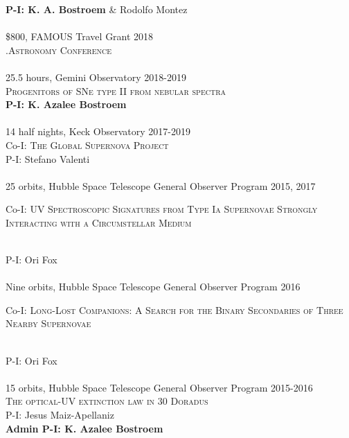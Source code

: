 \documentclass[10pt]{cv}
\begin{document}
\begin{llist}
{\bf P-I: K. A. Bostroem} \& Rodolfo Montez\\
\\
\$800, FAMOUS Travel Grant \hfill2018\\ 
\textsc{.Astronomy Conference}\\
\\
25.5 hours, Gemini Observatory \hfill 2018-2019\\
\textsc{Progenitors of SNe type II from nebular spectra}\\
{\bf P-I: K. Azalee Bostroem} \\
\\
14 half nights, Keck Observatory \hfill 2017-2019\\
Co-I: \textsc{The Global Supernova Project}\\
P-I: Stefano Valenti \\
\\
25 orbits, Hubble Space Telescope General Observer Program \hfill 2015, 2017\\ %
\begin{minipage}[l]{0.7\textwidth}\vspace{0.15cm}
Co-I: \textsc{UV Spectroscopic Signatures from Type Ia Supernovae Strongly Interacting with a Circumstellar Medium}
\end{minipage}\vspace{0.15cm}\\
P-I: Ori Fox \\
\\
Nine orbits, Hubble Space Telescope General Observer Program \hfill 2016\\ %
\begin{minipage}[l]{0.7\textwidth}\vspace{0.15cm}
Co-I: \textsc{Long-Lost Companions: A Search for the Binary Secondaries of Three Nearby Supernovae}
\end{minipage}\vspace{0.15cm}\\
P-I: Ori Fox \\
\\
15 orbits, Hubble Space Telescope General Observer Program \hfill 2015-2016\\ %
\textsc{The optical-UV extinction law in 30 Doradus}\\
P-I: Jesus Maiz-Apellaniz \\
{\bf Admin P-I: K. Azalee Bostroem} \\
\\


\end{llist}
\end{document}
